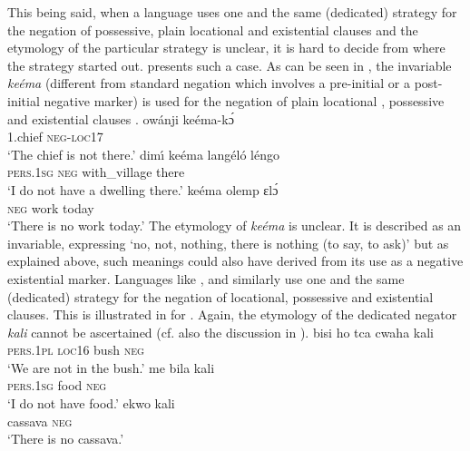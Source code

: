 \documentclass[output=paper]{langscibook}
\begin{document}
This being said, when a language uses one and the same (dedicated) strategy
for the negation of possessive, plain locational and existential clauses
and the etymology of the particular strategy is unclear, it is hard to
decide from where the strategy started out.  presents such a
case. As can be seen in , the invariable \textit{ke{\'e}ma} (different from standard
negation which involves a pre-initial or a post-initial negative marker) is
used for the negation of plain locational , possessive
 and existential clauses .
\ea\label{ex:tetela-chief-dwelling-work}
\ea\label{ex:tetela-chief} \gll ow{\'a}nji ke{\'e}ma-k{\'ɔ}\\ 1.chief
\textsc{neg-loc}17\\ 
\glt 	`The chief is not there.'
%
\ex\label{ex:tetela-dwelling} 
\gll dim{\'\i} ke{\'e}ma lang{\'e}l{\'o} l{\'e}ngo\\ 
\textsc{pers.1sg} \textsc{neg} with\_village there\\ \glt 	`I
do not have a dwelling there.' \ex\label{ex:tetela-work} \gll ke{\'e}ma
olemp ɛl{\'ɔ}\\ \textsc{neg} work today\\ \glt 	`There is no work today.'
\z\z The etymology of \textit{ke{\'e}ma} is unclear. It is described as an
invariable, expressing `no, not, nothing, there is nothing (to say, to
ask)' \citep[155]{Hagendorens1957} but as explained above, such meanings
could also have derived from its use as a negative existential marker.
Languages like ,  and  similarly use one
and the same (dedicated) strategy for the negation of locational,
possessive and existential clauses. This is illustrated in
 for . Again, the etymology of
the dedicated negator \textit{kali} cannot be ascertained (cf. also the
discussion in ).
%
\ea\label{ex:mbete-bush-food-cassava}  
\ea\gll bisi ho {tca cwaha} kali\\ \textsc{pers.1pl}
\textsc{loc}16 bush \textsc{neg}\\ 
\glt `We are not in the bush.'
\ex\gll me bila kali\\ 
\textsc{pers.1sg} food \textsc{neg}\\ 
\glt 	`I do not have food.' 
\ex\gll ekwo kali\\ cassava \textsc{neg}\\ 
\glt `There is no cassava.' \z\z
\end{document}
